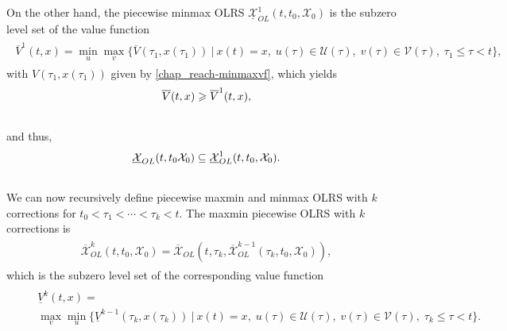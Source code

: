 \documentclass[letterpaper,10pt,english]{sphinxmanual}
\begin{document}
On the other hand, the piecewise minmax OLRS
$\underline{{\mathcal X}}_{OL}^1(t, t_0, {\mathcal X}_0)$ is the
subzero level set of the value function
\label{chap_reach:equation-minmaxvf1}\begin{gather}
\begin{split}\overline{V}^1(t, x) =
\min_u\max_v\{\overline{V}(\tau_1, x(\tau_1)) ~|~ x(t)=x, \;
u(\tau)\in{\mathcal U}(\tau), \; v(\tau)\in{\mathcal V}(\tau), \; \tau_1\leqslant\tau<t\},\end{split}\label{chap_reach-minmaxvf1}
\end{gather}
with $V(\tau_1, x(\tau_1))$ given by \eqref{chap_reach-minmaxvf}, which yields
\begin{gather}
\begin{split}\overline{V}(t, x) \geqslant\overline{V}^1(t, x),\end{split}\notag\\\begin{split}\end{split}\notag
\end{gather}
and thus,
\begin{gather}
\begin{split}\underline{{\mathcal X}}_{OL}(t, t_0 {\mathcal X}_0) \subseteq \underline{{\mathcal X}}_{OL}^1(t, t_0, {\mathcal X}_0) .\end{split}\notag\\\begin{split}\end{split}\notag
\end{gather}
We can now recursively define piecewise maxmin and minmax OLRS with
$k$ corrections for $t_0<\tau_1<\cdots<\tau_k<t$. The maxmin
piecewise OLRS with $k$ corrections is
\label{chap_reach:equation-maxmink}\begin{gather}
\begin{split}\overline{{\mathcal X}}_{OL}^k(t, t_0, {\mathcal X}_0) =
\overline{{\mathcal X}}_{OL}(t, \tau_k, \overline{{\mathcal X}}_{OL}^{k-1}(\tau_k, t_0, {\mathcal X}_0)),\end{split}\label{chap_reach-maxmink}
\end{gather}
which is the subzero level set of the corresponding value function
\label{chap_reach:equation-maxminvfk}\begin{gather}
\begin{split}\begin{aligned}
&&\underline{V}^k(t, x) = \nonumber \\
&&\max_v\min_u\{\underline{V}^{k-1}(\tau_k, x(\tau_k)) ~|~ x(t)=x, \;
u(\tau)\in{\mathcal U}(\tau), \; v(\tau)\in{\mathcal V}(\tau), \; \tau_k\leqslant\tau<t\}.
\end{aligned}\end{split}\label{chap_reach-maxminvfk}
\end{gather}
\end{document}
